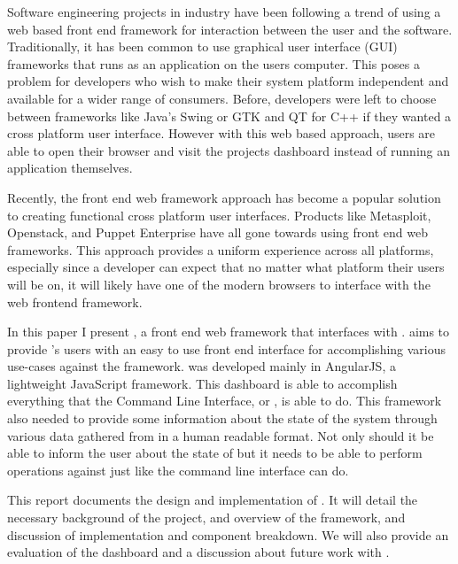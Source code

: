 
\pagestyle{empty}
\setlength{\baselineskip}{0.8cm}



Software engineering projects in industry have been following a trend of using a web based front end framework for interaction between the user and the software. Traditionally, it has been common to use graphical user interface (GUI) frameworks that runs as an application on the users computer. This poses a problem for developers who wish to make their system platform independent and available for a wider range of consumers. Before, developers were left to choose between frameworks like Java’s Swing or GTK and QT for C++ if they wanted a cross platform user interface. However with this web based approach, users are able to open their browser and visit the projects dashboard instead of running an application themselves.

Recently, the front end web framework approach has become a popular solution to creating functional cross platform user interfaces. Products like Metasploit, Openstack, and Puppet Enterprise have all gone towards using front end web frameworks. This approach provides a uniform experience across all platforms, especially since a developer can expect that no matter what platform their users will be on, it will likely have one of the modern browsers to interface with the web frontend framework.

In this paper I present \projectName{}, a front end web framework that interfaces with \ancor{}. \projectName{} aims to provide \ancor{}’s users with an easy to use front end interface for accomplishing various use-cases against the \ancor{} framework. \projectName{} was developed mainly in AngularJS, a lightweight JavaScript framework. This dashboard is able to accomplish everything that the \ancor{} Command Line Interface, or \ancorcli, is able to do. This framework also needed to provide some information about the state of the system through various data gathered from \ancor{} in a human readable format. Not only should it be able to inform the user about the state of \ancor{} but it needs to be able to perform operations against \ancor{} just like the command line interface can do.

This report documents the design and implementation of \projectName. It will detail the necessary background of the project, and overview of the framework, and discussion of implementation and component breakdown. We will also provide an evaluation of the dashboard and a discussion about future work with \projectName{}.
